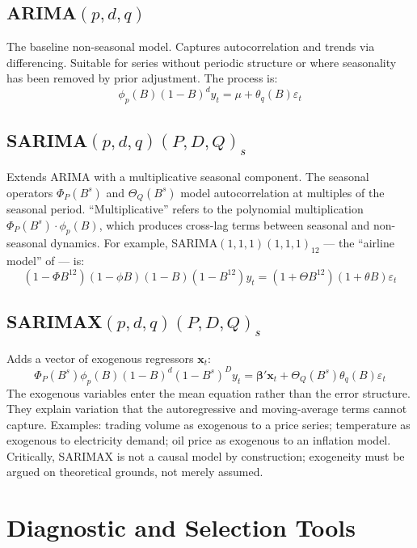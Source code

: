 \documentclass[12pt,a4paper]{article}
\begin{document}
\subsection{ARIMA$(p,d,q)$}

The baseline non-seasonal model. Captures autocorrelation and trends
via differencing. Suitable for series without periodic structure or where
seasonality has been removed by prior adjustment. The process is:
\[
    \phi_p(B)(1-B)^d y_t = \mu + \theta_q(B)\varepsilon_t
\]

\subsection{SARIMA$(p,d,q)(P,D,Q)_s$}

Extends ARIMA with a multiplicative seasonal component. The seasonal
operators $\Phi_P(B^s)$ and $\Theta_Q(B^s)$ model autocorrelation at
multiples of the seasonal period. ``Multiplicative'' refers to the polynomial
multiplication $\Phi_P(B^s)\cdot\phi_p(B)$, which produces cross-lag terms
between seasonal and non-seasonal dynamics. For example, SARIMA$(1,1,1)(1,1,1)_{12}$
— the ``airline model'' of \citet{BoxJenkins1976} — is:
\[
    (1-\Phi B^{12})(1-\phi B)(1-B)(1-B^{12})y_t = (1+\Theta B^{12})(1+\theta B)\varepsilon_t
\]

\subsection{SARIMAX$(p,d,q)(P,D,Q)_s$}

Adds a vector of exogenous regressors $\mathbf{x}_t$:
\[
    \Phi_P(B^s)\phi_p(B)(1-B)^d(1-B^s)^D y_t
    = \boldsymbol{\beta}'\mathbf{x}_t + \Theta_Q(B^s)\theta_q(B)\varepsilon_t
\]
The exogenous variables enter the mean equation rather than the error structure.
They explain variation that the autoregressive and moving-average terms cannot
capture. Examples: trading volume as exogenous to a price series; temperature as
exogenous to electricity demand; oil price as exogenous to an inflation model.
Critically, SARIMAX is not a causal model by construction; exogeneity must be
argued on theoretical grounds, not merely assumed.

\section{Diagnostic and Selection Tools}
\end{document}

